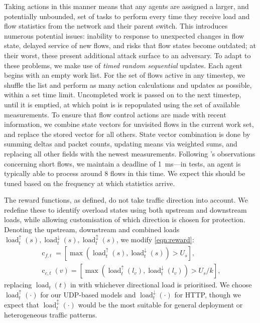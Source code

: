 \documentclass[conference, letterpaper, 10pt, times]{IEEEtran}
\newcommand{\fakepara}[1]{\noindent\textbf{#1:}}
\begin{document}
Taking actions in this manner means that any agents are assigned a larger, and potentially unbounded, set of tasks to perform every time they receive load and flow statistics from the network and their parent switch.
This introduces numerous potential issues: inability to response to unexpected changes in flow state, delayed service of new flows, and risks that flow states become outdated; at their worst, these present additional attack surface to an adversary.
To adapt to these problems, we make use of \emph{timed random sequential} updates.
Each agent begins with an empty work list.
For the set of flows active in any timestep, we shuffle the list and perform as many action calculations and updates as possible, within a set time limit.
Uncompleted work is passed on to the next timestep, until it is emptied, at which point is is repopulated using the set of available measurements.
To ensure that flow control actions are made with recent information, we combine state vectors for unvisited flows in the current work set, and replace the stored vector for all others.
State vector combination is done by summing deltas and packet counts, updating means via weighted sums, and replacing all other fields with the newest measurements.
Following \textcite{DBLP:conf/sigcomm/ChenL0L18}'s observations concerning short flows, we maintain a deadline of \SI{1}{\milli\second}---in tests, an agent is typically able to process around 8 flows in this time.
We expect this should be tuned based on the frequency at which statistics arrive.

{
\newcommand{\load}[2]{\operatorname{load}^{#2}_{t}(#1)}
\newcommand{\uload}[1]{\load{#1}{\uparrow}}
\newcommand{\dload}[1]{\load{#1}{\downarrow}}
\newcommand{\bload}[1]{\load{#1}{\updownarrow}}
\newcommand{\cond}[2]{\operatorname{c}_{#1,t}#2}
The reward functions, as defined, do not take traffic direction into account.
We redefine these to identify overload states using both upstream and downstream loads, while allowing customisation of which direction is chosen for protection.
Denoting the upstream, downstream and combined loads $\uload{s}, \dload{s}, \bload{s}$, we modify \cref{eqn:reward}:
\begin{subequations}
\begin{gather}
\cond{f} = [\max(\uload{s}, \dload{s}) > U_s],\\
\cond{c}{(v)} = [\max(\uload{l_v}, \dload{l_v}) > U_s/k],
\end{gather}
\end{subequations}
replacing $\load{t}{}$ in  with whichever directional load is prioritised.
We choose $\uload{\cdot}$ for our UDP-based models and $\dload{\cdot}$ for HTTP, though we expect that $\bload{\cdot}$ would be the most suitable for general deployment or heterogeneous traffic patterns.
}
\end{document}
